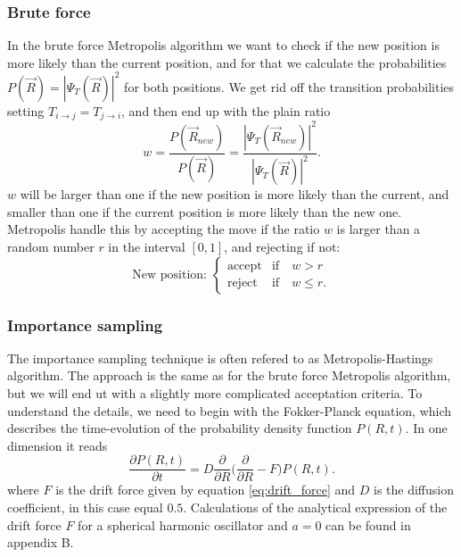\documentclass[norsk,a4paper,12pt]{article}
\begin{document}
\subsubsection{Brute force}
In the brute force Metropolis algorithm we want to check if the new position is more likely than the current position, and for that we calculate the probabilities $P(\vec{R})=|\Psi_T(\vec{R})|^2$ for both positions. We get rid off the transition probabilities setting $T_{i\rightarrow j}=T_{j\rightarrow i}$, and then end up with the plain ratio
\begin{equation}
w=\frac{P(\vec{R}_{new})}{P(\vec{R})}=\frac{|\Psi_T(\vec{R}_{new})|^2}{|\Psi_T(\vec{R})|^2}.
\end{equation}
$w$ will be larger than one if the new position is more likely than the current, and smaller than one if the current position is more likely than the new one. Metropolis handle this by accepting the move if the ratio $w$ is larger than a random number $r$ in the interval $[0,1]$, and rejecting if not:
\begin{equation}
\text{New position: }
\begin{cases} 
   \text{accept} & \text{if}\quad w > r \\
   \text{reject} & \text{if}\quad w \leq r.
\end{cases}
\end{equation}

\subsubsection{Importance sampling} \label{Importance_sampling}
The importance sampling technique is often refered to as Metropolis-Hastings algorithm. The approach is the same as for the brute force Metropolis algorithm, but we will end ut with a slightly more complicated acceptation criteria. To understand the details, we need to begin with the Fokker-Planck equation, which describes the time-evolution of the probability density function $P(R,t)$. In one dimension it reads
\begin{equation}
\frac{\partial P(R,t)}{\partial t} = D\frac{\partial}{\partial R}\bigg(\frac{\partial}{\partial R} - F\bigg)P(R,t).
\end{equation}
where $F$ is the drift force given by equation \ref{eq:drift_force} and $D$ is the diffusion coefficient, in this case equal $0.5$. Calculations of the analytical expression of the drift force $F$ for a spherical harmonic oscillator and $a=0$ can be found in appendix B.
\end{document}

